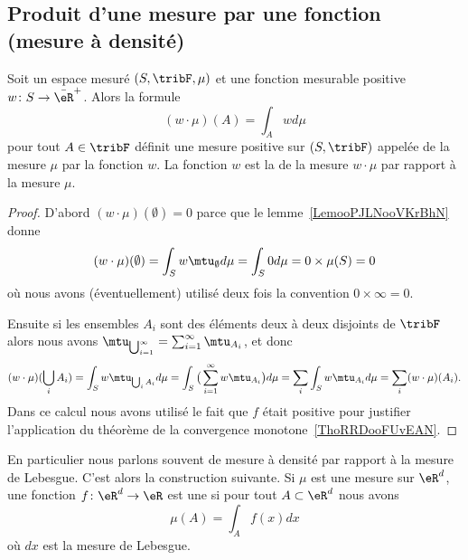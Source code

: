 \subsection{Produit d'une mesure par une fonction (mesure à densité)}

\begin{propositionDef}\label{PropooVXPMooGSkyBo}
    Soit un espace mesuré \( (S,\tribF,\mu)\) et une fonction mesurable positive \( w\colon S\to \bar\eR^+\). Alors la formule
    \begin{equation}
        (w\cdot \mu)(A)=\int_Awd\mu
    \end{equation}
    pour tout \( A\in \tribF\) définit une mesure positive sur \( (S,\tribF)\) appelée  de la mesure \( \mu\) par la fonction \( w\). La fonction \( w\) est la  de la mesure \( w\cdot \mu\) par rapport à la mesure \( \mu\).
\end{propositionDef}

\begin{proof}
    D'abord \( (w\cdot \mu)(\emptyset)=0\) parce que le lemme~\ref{LemooPJLNooVKrBhN} donne
    \begin{equation}
        (w\cdot \mu)(\emptyset)=\int_Sw\mtu_{\emptyset}d\mu=\int_S0d\mu=0\times \mu(S)=0
    \end{equation}
    où nous avons (éventuellement) utilisé deux fois la convention \( 0\times \infty=0\).


    Ensuite si les ensembles \( A_i\) sont des éléments deux à deux disjoints de \( \tribF\) alors nous avons \( \mtu_{\bigcup_{i=1}^{\infty}}=\sum_{i=1}^{\infty}\mtu_{A_i}\), et donc
    \begin{equation}
        (w\cdot \mu)(\bigcup_iA_i)=\int_Sw\mtu_{\bigcup_iA_i}d\mu=\int_S\big( \sum_{i=1}^{\infty}w\mtu_{A_i} \big)d\mu=\sum_i\int_Sw\mtu_{A_i}d\mu=\sum_i(w\cdot\mu)(A_i).
    \end{equation}
    Dans ce calcul nous avons utilisé le fait que \( f\) était positive pour justifier l'application du théorème de la convergence monotone~\ref{ThoRRDooFUvEAN}.
\end{proof}

En particulier nous parlons souvent de mesure à densité par rapport à la mesure de Lebesgue. C'est alors la construction suivante. Si \( \mu\) est une mesure sur \( \eR^d\), une fonction \( f\colon \eR^d\to \eR\) est une  si pour tout \( A\subset\eR^d\) nous avons
\begin{equation}
    \mu(A)=\int_Af(x)dx
\end{equation}
où \( dx\) est la mesure de Lebesgue.

